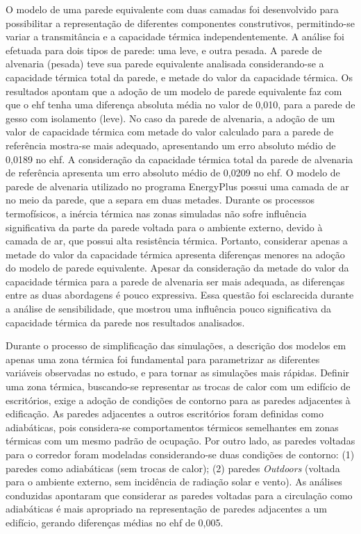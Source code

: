 \documentclass[brazil,hardcopy,openany]{ufscthesis} %
\begin{document}
	O modelo de uma parede equivalente com duas camadas foi desenvolvido para possibilitar a representação de diferentes componentes construtivos, permitindo-se variar a transmitância e a capacidade térmica independentemente. A análise foi efetuada para dois tipos de parede: uma leve, e outra pesada. A parede de alvenaria (pesada) teve sua parede equivalente analisada considerando-se a capacidade térmica total da parede, e metade do valor da capacidade térmica.
	Os resultados apontam que a adoção de um modelo de parede equivalente faz com que o \acrshort{ehf} tenha uma diferença absoluta média no valor de 0,010, para a parede de gesso com isolamento (leve).
	No caso da parede de alvenaria, a adoção de um valor de capacidade térmica com metade do valor calculado para a parede de referência mostra-se mais adequado, apresentando um erro absoluto médio de 0,0189 no \acrshort{ehf}. A consideração da capacidade térmica total da parede de alvenaria de referência apresenta um erro absoluto médio de 0,0209 no \acrshort{ehf}.
	O modelo de parede de alvenaria utilizado no programa EnergyPlus possui uma camada de ar no meio da parede, que a separa em duas metades. Durante os processos termofísicos, a inércia térmica nas zonas simuladas não sofre influência significativa da parte da parede voltada para o ambiente externo, devido à camada de ar, que possui alta resistência térmica. Portanto, considerar apenas a metade do valor da capacidade térmica apresenta diferenças menores na adoção do modelo de parede equivalente.
	Apesar da consideração da metade do valor da capacidade térmica para a parede de alvenaria ser mais adequada, as diferenças entre as duas abordagens é pouco expressiva.
	Essa questão foi esclarecida durante a análise de sensibilidade, que mostrou uma influência pouco significativa da capacidade térmica da parede nos resultados analisados.
	
	Durante o processo de simplificação das simulações, a descrição dos modelos em apenas uma zona térmica foi fundamental para parametrizar as diferentes variáveis observadas no estudo, e para tornar as simulações mais rápidas.
	Definir uma zona térmica, buscando-se representar as trocas de calor com um edifício de escritórios, exige a adoção de condições de contorno para as paredes adjacentes à edificação. 
	As paredes adjacentes a outros escritórios foram definidas como adiabáticas, pois considera-se comportamentos térmicos semelhantes em zonas térmicas com um mesmo padrão de ocupação. 
	Por outro lado, as paredes voltadas para o corredor foram modeladas considerando-se duas condições de contorno: (1) paredes como adiabáticas (sem trocas de calor); (2) paredes \textit{Outdoors} (voltada para o ambiente externo, sem incidência de radiação solar e vento).
	As análises conduzidas apontaram que considerar as paredes voltadas para a circulação como adiabáticas é mais apropriado na representação de paredes adjacentes a um edifício, gerando diferenças médias no \acrshort{ehf} de 0,005.
	
\end{document}
